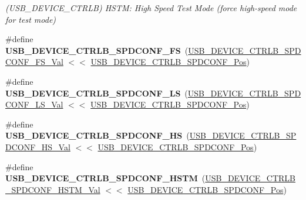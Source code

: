 \begin{DoxyCompactItemize}
\begin{DoxyCompactList}\small\item\em (U\+S\+B\+\_\+\+D\+E\+V\+I\+C\+E\+\_\+\+C\+T\+R\+L\+B) H\+S\+T\+M\+: High Speed Test Mode (force high-\/speed mode for test mode) \end{DoxyCompactList}\item 
\hypertarget{group___s_a_m_l21___u_s_b_gad9d863f2b485961b88ec521ef2ae6410}{}\#define {\bfseries U\+S\+B\+\_\+\+D\+E\+V\+I\+C\+E\+\_\+\+C\+T\+R\+L\+B\+\_\+\+S\+P\+D\+C\+O\+N\+F\+\_\+\+F\+S}~(\hyperlink{group___s_a_m_l21___u_s_b_ga3be2b809af4ab86f679b64a276ff0cb9}{U\+S\+B\+\_\+\+D\+E\+V\+I\+C\+E\+\_\+\+C\+T\+R\+L\+B\+\_\+\+S\+P\+D\+C\+O\+N\+F\+\_\+\+F\+S\+\_\+\+Val} $<$$<$ \hyperlink{group___s_a_m_l21___u_s_b_gab5b9688f10e2ab8aa52f42628139b6eb}{U\+S\+B\+\_\+\+D\+E\+V\+I\+C\+E\+\_\+\+C\+T\+R\+L\+B\+\_\+\+S\+P\+D\+C\+O\+N\+F\+\_\+\+Pos})\label{group___s_a_m_l21___u_s_b_gad9d863f2b485961b88ec521ef2ae6410}

\item 
\hypertarget{group___s_a_m_l21___u_s_b_ga1c500f57117f80d7b7b60ee693fa9099}{}\#define {\bfseries U\+S\+B\+\_\+\+D\+E\+V\+I\+C\+E\+\_\+\+C\+T\+R\+L\+B\+\_\+\+S\+P\+D\+C\+O\+N\+F\+\_\+\+L\+S}~(\hyperlink{group___s_a_m_l21___u_s_b_ga8734dfea787a3ab59ab0704d1a81ca76}{U\+S\+B\+\_\+\+D\+E\+V\+I\+C\+E\+\_\+\+C\+T\+R\+L\+B\+\_\+\+S\+P\+D\+C\+O\+N\+F\+\_\+\+L\+S\+\_\+\+Val} $<$$<$ \hyperlink{group___s_a_m_l21___u_s_b_gab5b9688f10e2ab8aa52f42628139b6eb}{U\+S\+B\+\_\+\+D\+E\+V\+I\+C\+E\+\_\+\+C\+T\+R\+L\+B\+\_\+\+S\+P\+D\+C\+O\+N\+F\+\_\+\+Pos})\label{group___s_a_m_l21___u_s_b_ga1c500f57117f80d7b7b60ee693fa9099}

\item 
\hypertarget{group___s_a_m_l21___u_s_b_ga4e1272f10448a1e2b4212da7e5f3310e}{}\#define {\bfseries U\+S\+B\+\_\+\+D\+E\+V\+I\+C\+E\+\_\+\+C\+T\+R\+L\+B\+\_\+\+S\+P\+D\+C\+O\+N\+F\+\_\+\+H\+S}~(\hyperlink{group___s_a_m_l21___u_s_b_gaf86110a47503261b362a0efa2d2c83a3}{U\+S\+B\+\_\+\+D\+E\+V\+I\+C\+E\+\_\+\+C\+T\+R\+L\+B\+\_\+\+S\+P\+D\+C\+O\+N\+F\+\_\+\+H\+S\+\_\+\+Val} $<$$<$ \hyperlink{group___s_a_m_l21___u_s_b_gab5b9688f10e2ab8aa52f42628139b6eb}{U\+S\+B\+\_\+\+D\+E\+V\+I\+C\+E\+\_\+\+C\+T\+R\+L\+B\+\_\+\+S\+P\+D\+C\+O\+N\+F\+\_\+\+Pos})\label{group___s_a_m_l21___u_s_b_ga4e1272f10448a1e2b4212da7e5f3310e}

\item 
\hypertarget{group___s_a_m_l21___u_s_b_gadc92c32f657a15bd46ef72c65ea49580}{}\#define {\bfseries U\+S\+B\+\_\+\+D\+E\+V\+I\+C\+E\+\_\+\+C\+T\+R\+L\+B\+\_\+\+S\+P\+D\+C\+O\+N\+F\+\_\+\+H\+S\+T\+M}~(\hyperlink{group___s_a_m_l21___u_s_b_gadbc04e8c5b3f542b3f498c7397f9700d}{U\+S\+B\+\_\+\+D\+E\+V\+I\+C\+E\+\_\+\+C\+T\+R\+L\+B\+\_\+\+S\+P\+D\+C\+O\+N\+F\+\_\+\+H\+S\+T\+M\+\_\+\+Val} $<$$<$ \hyperlink{group___s_a_m_l21___u_s_b_gab5b9688f10e2ab8aa52f42628139b6eb}{U\+S\+B\+\_\+\+D\+E\+V\+I\+C\+E\+\_\+\+C\+T\+R\+L\+B\+\_\+\+S\+P\+D\+C\+O\+N\+F\+\_\+\+Pos})\label{group___s_a_m_l21___u_s_b_gadc92c32f657a15bd46ef72c65ea49580}


\end{DoxyCompactItemize}
